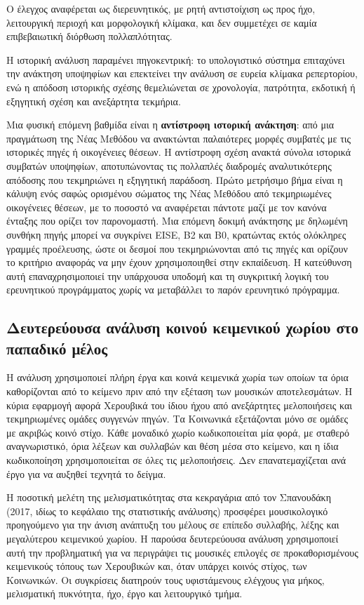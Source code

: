 \documentclass[11pt,a4paper]{article}
\begin{document}
Ο έλεγχος αναφέρεται ως διερευνητικός, με ρητή αντιστοίχιση ως προς ήχο, λειτουργική περιοχή και μορφολογική κλίμακα, και δεν συμμετέχει σε καμία επιβεβαιωτική διόρθωση πολλαπλότητας.

Η ιστορική ανάλυση παραμένει πηγοκεντρική: το υπολογιστικό σύστημα επιταχύνει την ανάκτηση υποψηφίων και επεκτείνει την ανάλυση σε ευρεία κλίμακα ρεπερτορίου, ενώ η απόδοση ιστορικής σχέσης θεμελιώνεται σε χρονολογία, πατρότητα, εκδοτική ή εξηγητική σχέση και ανεξάρτητα τεκμήρια.

Μια φυσική επόμενη βαθμίδα είναι η \textbf{αντίστροφη ιστορική ανάκτηση}: από μια πραγμάτωση της Νέας Μεθόδου να ανακτώνται παλαιότερες μορφές συμβατές με τις ιστορικές πηγές ή οικογένειες θέσεων. Η αντίστροφη σχέση ανακτά σύνολα ιστορικά συμβατών υποψηφίων, αποτυπώνοντας τις πολλαπλές διαδρομές αναλυτικότερης απόδοσης που τεκμηριώνει η εξηγητική παράδοση. Πρώτο μετρήσιμο βήμα είναι η κάλυψη ενός σαφώς ορισμένου σώματος της Νέας Μεθόδου από τεκμηριωμένες οικογένειες θέσεων, με το ποσοστό να αναφέρεται πάντοτε μαζί με τον κανόνα ένταξης που ορίζει τον παρονομαστή. Μια επόμενη δοκιμή ανάκτησης με δηλωμένη συνθήκη πηγής μπορεί να συγκρίνει EISE, B2 και B0, κρατώντας εκτός ολόκληρες γραμμές προέλευσης, ώστε οι δεσμοί που τεκμηριώνονται από τις πηγές και ορίζουν το κριτήριο αναφοράς να μην έχουν χρησιμοποιηθεί στην εκπαίδευση. Η κατεύθυνση αυτή επαναχρησιμοποιεί την υπάρχουσα υποδομή και τη συγκριτική λογική του ερευνητικού προγράμματος χωρίς να μεταβάλλει το παρόν ερευνητικό πρόγραμμα.



\subsection{Δευτερεύουσα ανάλυση κοινού κειμενικού χωρίου στο παπαδικό μέλος}\label{sec:text-locus}

Η ανάλυση χρησιμοποιεί πλήρη έργα και κοινά κειμενικά χωρία των οποίων τα όρια καθορίζονται από το κείμενο πριν από την εξέταση των μουσικών αποτελεσμάτων. Η κύρια εφαρμογή αφορά Χερουβικά του ίδιου ήχου από ανεξάρτητες μελοποιήσεις και τεκμηριωμένες ομάδες συγγενών πηγών. Τα Κοινωνικά εξετάζονται μόνο σε ομάδες με ακριβώς κοινό στίχο. Κάθε μοναδικό χωρίο κωδικοποιείται μία φορά, με σταθερό αναγνωριστικό, όρια λέξεων και συλλαβών και θέση μέσα στο κείμενο, και η ίδια κωδικοποίηση χρησιμοποιείται σε όλες τις μελοποιήσεις. Δεν επανατεμαχίζεται ανά έργο για να αυξηθεί τεχνητά το δείγμα.

Η ποσοτική μελέτη της μελισματικότητας στα κεκραγάρια από τον Σπανουδάκη (2017, ιδίως το κεφάλαιο της στατιστικής ανάλυσης) προσφέρει μουσικολογικό προηγούμενο για την άνιση ανάπτυξη του μέλους σε επίπεδο συλλαβής, λέξης και μεγαλύτερου κειμενικού χωρίου. Η παρούσα δευτερεύουσα ανάλυση χρησιμοποιεί αυτή την προβληματική για να περιγράψει τις μουσικές επιλογές σε προκαθορισμένους κειμενικούς τόπους των Χερουβικών και, όταν υπάρχει κοινός στίχος, των Κοινωνικών. Οι συγκρίσεις διατηρούν τους υφιστάμενους ελέγχους για μήκος, μελισματική πυκνότητα, ήχο, έργο και λειτουργικό τμήμα.
\end{document}
